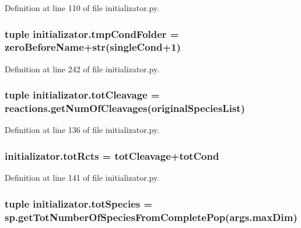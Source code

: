 Definition at line 110 of file initializator.\-py.

\hypertarget{a00104_ad43d43e724c966749db268c9b523a02c}{
\subsubsection[{tmp\-Cond\-Folder}]{\setlength{\rightskip}{0pt plus 5cm}tuple initializator.\-tmp\-Cond\-Folder = {\bf zero\-Before\-Name}+str(single\-Cond+1)}}\label{a00104_ad43d43e724c966749db268c9b523a02c}


Definition at line 242 of file initializator.\-py.

\hypertarget{a00104_a517da3913f56e5216fa2c68818e04ecc}{
\subsubsection[{tot\-Cleavage}]{\setlength{\rightskip}{0pt plus 5cm}tuple initializator.\-tot\-Cleavage = reactions.\-get\-Num\-Of\-Cleavages({\bf original\-Species\-List})}}\label{a00104_a517da3913f56e5216fa2c68818e04ecc}


Definition at line 136 of file initializator.\-py.

\hypertarget{a00104_a1c0855f92c2dd2dd4a30f6624f6e1af0}{
\subsubsection[{tot\-Rcts}]{\setlength{\rightskip}{0pt plus 5cm}initializator.\-tot\-Rcts = {\bf tot\-Cleavage}+tot\-Cond}}\label{a00104_a1c0855f92c2dd2dd4a30f6624f6e1af0}


Definition at line 141 of file initializator.\-py.

\hypertarget{a00104_a7f8e1635318ca1aac728dd7165aa49b5}{
\subsubsection[{tot\-Species}]{\setlength{\rightskip}{0pt plus 5cm}tuple initializator.\-tot\-Species = sp.\-get\-Tot\-Number\-Of\-Species\-From\-Complete\-Pop(args.\-max\-Dim)}}\label{a00104_a7f8e1635318ca1aac728dd7165aa49b5}


